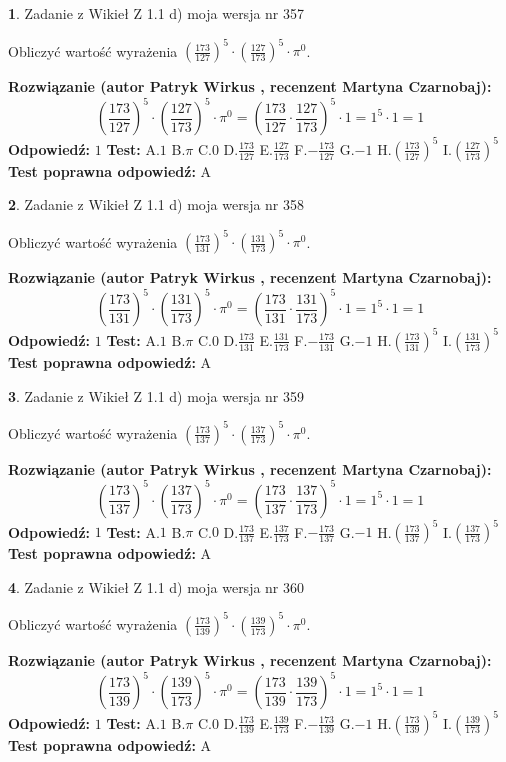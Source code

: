 \documentclass[12pt, a4paper]{article}
\theoremstyle{definition} %
\newtheorem{zad}{}
\newcommand{\zadStart}[1]{\begin{zad}#1\newline}
\newcommand{\zadStop}{\end{zad}}
\newcommand{\rozwStart}[2]{\noindent \textbf{Rozwiązanie (autor #1 , recenzent #2): }\newline}
\newcommand{\rozwStop}{\newline}
\newcommand{\odpStart}{\noindent \textbf{Odpowiedź:}\newline}
\newcommand{\odpStop}{\newline}
\newcommand{\testStart}{\noindent \textbf{Test:}\newline}
\newcommand{\testStop}{\newline}
\newcommand{\kluczStart}{\noindent \textbf{Test poprawna odpowiedź:}\newline}
\newcommand{\kluczStop}{\newline}
\begin{document}
\zadStart{Zadanie z Wikieł Z 1.1 d) moja wersja nr 357}

Obliczyć wartość wyrażenia $(\frac{173}{127})^{5} \cdot (\frac{127}{173})^{5} \cdot \pi^{0}$.
\zadStop
\rozwStart{Patryk Wirkus}{Martyna Czarnobaj}
$$(\frac{173}{127})^{5} \cdot (\frac{127}{173})^{5} \cdot \pi^{0} = (\frac{173}{127} \cdot \frac{127}{173})^{5} \cdot 1 = 1^{5} \cdot 1 = 1$$
\rozwStop
\odpStart
$1$
\odpStop
\testStart
A.$1$ B.$\pi$ C.$0$ D.$\frac{173}{127}$ E.$\frac{127}{173}$
F.$-\frac{173}{127}$ G.$-1$
H.$(\frac{173}{127})^{5}$
I.$(\frac{127}{173})^{5}$
\testStop
\kluczStart
A
\kluczStop



\zadStart{Zadanie z Wikieł Z 1.1 d) moja wersja nr 358}

Obliczyć wartość wyrażenia $(\frac{173}{131})^{5} \cdot (\frac{131}{173})^{5} \cdot \pi^{0}$.
\zadStop
\rozwStart{Patryk Wirkus}{Martyna Czarnobaj}
$$(\frac{173}{131})^{5} \cdot (\frac{131}{173})^{5} \cdot \pi^{0} = (\frac{173}{131} \cdot \frac{131}{173})^{5} \cdot 1 = 1^{5} \cdot 1 = 1$$
\rozwStop
\odpStart
$1$
\odpStop
\testStart
A.$1$ B.$\pi$ C.$0$ D.$\frac{173}{131}$ E.$\frac{131}{173}$
F.$-\frac{173}{131}$ G.$-1$
H.$(\frac{173}{131})^{5}$
I.$(\frac{131}{173})^{5}$
\testStop
\kluczStart
A
\kluczStop



\zadStart{Zadanie z Wikieł Z 1.1 d) moja wersja nr 359}

Obliczyć wartość wyrażenia $(\frac{173}{137})^{5} \cdot (\frac{137}{173})^{5} \cdot \pi^{0}$.
\zadStop
\rozwStart{Patryk Wirkus}{Martyna Czarnobaj}
$$(\frac{173}{137})^{5} \cdot (\frac{137}{173})^{5} \cdot \pi^{0} = (\frac{173}{137} \cdot \frac{137}{173})^{5} \cdot 1 = 1^{5} \cdot 1 = 1$$
\rozwStop
\odpStart
$1$
\odpStop
\testStart
A.$1$ B.$\pi$ C.$0$ D.$\frac{173}{137}$ E.$\frac{137}{173}$
F.$-\frac{173}{137}$ G.$-1$
H.$(\frac{173}{137})^{5}$
I.$(\frac{137}{173})^{5}$
\testStop
\kluczStart
A
\kluczStop



\zadStart{Zadanie z Wikieł Z 1.1 d) moja wersja nr 360}

Obliczyć wartość wyrażenia $(\frac{173}{139})^{5} \cdot (\frac{139}{173})^{5} \cdot \pi^{0}$.
\zadStop
\rozwStart{Patryk Wirkus}{Martyna Czarnobaj}
$$(\frac{173}{139})^{5} \cdot (\frac{139}{173})^{5} \cdot \pi^{0} = (\frac{173}{139} \cdot \frac{139}{173})^{5} \cdot 1 = 1^{5} \cdot 1 = 1$$
\rozwStop
\odpStart
$1$
\odpStop
\testStart
A.$1$ B.$\pi$ C.$0$ D.$\frac{173}{139}$ E.$\frac{139}{173}$
F.$-\frac{173}{139}$ G.$-1$
H.$(\frac{173}{139})^{5}$
I.$(\frac{139}{173})^{5}$
\testStop
\kluczStart
A
\kluczStop
\end{document}
